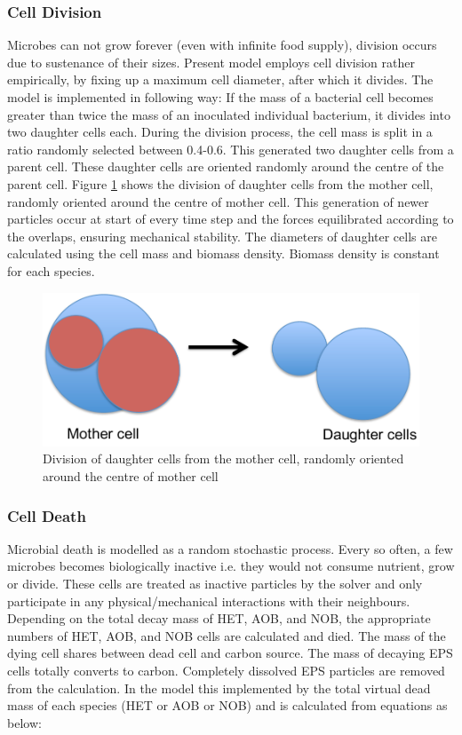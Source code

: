\documentclass[11pt,a4paper,openright]{article}
\begin{document}
\subsubsection{Cell Division}\label{divisionmol}
Microbes can not grow forever (even with infinite food supply), division occurs due to sustenance of their sizes. Present model employs cell division rather empirically, by fixing up a maximum cell diameter, after which it divides. The model is implemented in following way: If the mass of a bacterial cell becomes greater than twice the mass of an inoculated individual bacterium, it divides into two daughter cells each. During the division process, the cell mass is split in a ratio randomly selected between 0.4-0.6. This generated two daughter cells from a parent cell. These daughter cells are oriented randomly around the centre of the parent cell. Figure \ref{fig:divcr} shows the division of daughter cells from the mother cell, randomly oriented around the centre of mother cell. This generation of newer particles occur at start of every time step and the forces equilibrated according to the overlaps, ensuring mechanical stability. The diameters of daughter cells are calculated using the cell mass and biomass density. Biomass density is constant for each species. 

\begin{figure}[H]
\begin{center}
  \includegraphics[width=0.6\columnwidth]{Figs/Divisioncrit.pdf}
\caption{Division of daughter cells from the mother cell, randomly oriented around the centre of mother cell}
\label{fig:divcr}       %
\end{center}
\end{figure}  


\subsubsection{Cell Death}\label{deathmol}
Microbial death is modelled as a random stochastic process. Every so often, a few microbes becomes biologically inactive i.e. they would not consume nutrient, grow or divide. These cells are treated as inactive particles by the solver and only participate in any physical/mechanical interactions with their neighbours. Depending on the total decay mass of HET, AOB, and NOB, the appropriate numbers of HET, AOB, and NOB cells are calculated and died. The mass of the dying cell shares between dead cell and carbon source. The mass of decaying EPS cells totally converts to carbon. Completely dissolved EPS particles are removed from the calculation. In the model this implemented by the total virtual dead mass of each species (HET or AOB or NOB) and is calculated from equations as below:
\end{document}
